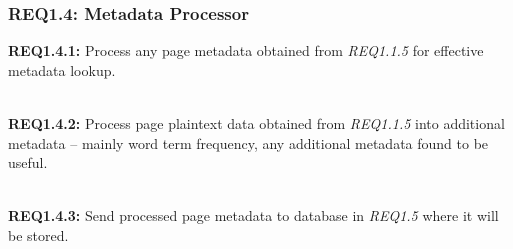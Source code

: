 \subsubsection{REQ1.4: Metadata Processor}

\textbf{REQ1.4.1:} Process any page metadata obtained from \textit{REQ1.1.5} for effective metadata lookup.\par

\textbf{\\REQ1.4.2:} Process page plaintext data obtained from \textit{REQ1.1.5} into additional metadata -- mainly word term frequency, any additional metadata found to be useful.\par

\textbf{\\REQ1.4.3:} Send processed page metadata to database in \textit{REQ1.5} where it will be stored.\par
